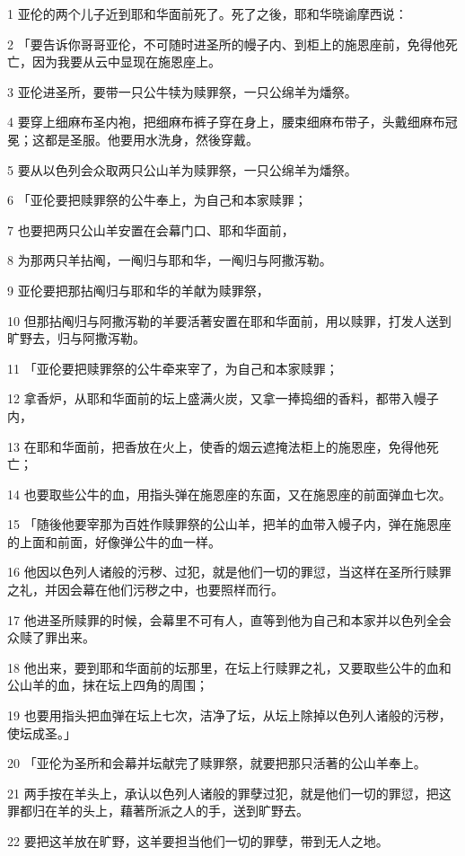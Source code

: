 \par 1 亚伦的两个儿子近到耶和华面前死了。死了之後，耶和华晓谕摩西说：
\par 2 「要告诉你哥哥亚伦，不可随时进圣所的幔子内、到柜上的施恩座前，免得他死亡，因为我要从云中显现在施恩座上。
\par 3 亚伦进圣所，要带一只公牛犊为赎罪祭，一只公绵羊为燔祭。
\par 4 要穿上细麻布圣内袍，把细麻布裤子穿在身上，腰束细麻布带子，头戴细麻布冠冕；这都是圣服。他要用水洗身，然後穿戴。
\par 5 要从以色列会众取两只公山羊为赎罪祭，一只公绵羊为燔祭。
\par 6 「亚伦要把赎罪祭的公牛奉上，为自己和本家赎罪；
\par 7 也要把两只公山羊安置在会幕门口、耶和华面前，
\par 8 为那两只羊拈阄，一阄归与耶和华，一阄归与阿撒泻勒。
\par 9 亚伦要把那拈阄归与耶和华的羊献为赎罪祭，
\par 10 但那拈阄归与阿撒泻勒的羊要活著安置在耶和华面前，用以赎罪，打发人送到旷野去，归与阿撒泻勒。
\par 11 「亚伦要把赎罪祭的公牛牵来宰了，为自己和本家赎罪；
\par 12 拿香炉，从耶和华面前的坛上盛满火炭，又拿一捧捣细的香料，都带入幔子内，
\par 13 在耶和华面前，把香放在火上，使香的烟云遮掩法柜上的施恩座，免得他死亡；
\par 14 也要取些公牛的血，用指头弹在施恩座的东面，又在施恩座的前面弹血七次。
\par 15 「随後他要宰那为百姓作赎罪祭的公山羊，把羊的血带入幔子内，弹在施恩座的上面和前面，好像弹公牛的血一样。
\par 16 他因以色列人诸般的污秽、过犯，就是他们一切的罪愆，当这样在圣所行赎罪之礼，并因会幕在他们污秽之中，也要照样而行。
\par 17 他进圣所赎罪的时候，会幕里不可有人，直等到他为自己和本家并以色列全会众赎了罪出来。
\par 18 他出来，要到耶和华面前的坛那里，在坛上行赎罪之礼，又要取些公牛的血和公山羊的血，抹在坛上四角的周围；
\par 19 也要用指头把血弹在坛上七次，洁净了坛，从坛上除掉以色列人诸般的污秽，使坛成圣。」
\par 20 「亚伦为圣所和会幕并坛献完了赎罪祭，就要把那只活著的公山羊奉上。
\par 21 两手按在羊头上，承认以色列人诸般的罪孽过犯，就是他们一切的罪愆，把这罪都归在羊的头上，藉著所派之人的手，送到旷野去。
\par 22 要把这羊放在旷野，这羊要担当他们一切的罪孽，带到无人之地。

